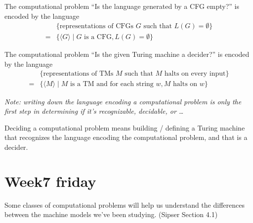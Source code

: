 \documentclass[12pt, oneside]{article}
\begin{document}
The computational problem ``Is the language generated by a CFG empty?'' is encoded by the language
\begin{align*}
  &\{ \textrm{representations of CFGs $G$  such that $L(G) = \emptyset$}\}  \\
  =& \{ \langle G \rangle \mid G \textrm{ is a CFG},  L(G) = \emptyset \}
\end{align*}



The computational problem ``Is the given Turing machine a decider?'' is encoded by the language
\begin{align*}
  &\{ \textrm{representations of TMs $M$  such that $M$ halts on every input}\}  \\
  =& \{ \langle M \rangle \mid M \textrm{ is a TM and for each string } w, \textrm{$M$ halts on $w$} \}
\end{align*}


{\it Note: writing down the language encoding a computational problem is only the first step in 
determining if it's recognizable, decidable, or \ldots }

Deciding a computational problem means building / defining a Turing 
machine that recognizes the language encoding the computational problem, and that 
is a decider.

 \vfill
\section*{Week7 friday}



Some classes of computational problems will 
help us understand the differences between the machine models we've been studying. (Sipser Section 4.1)
\end{document}
